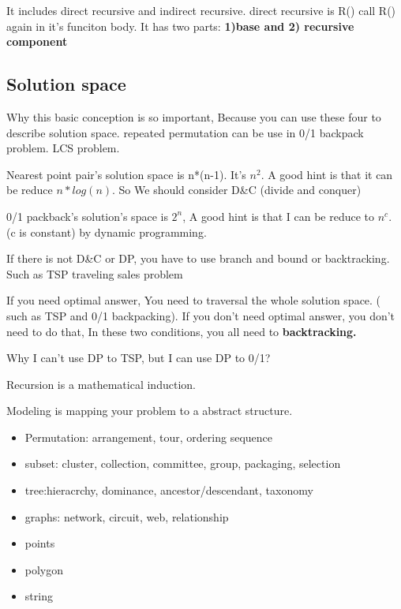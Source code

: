 \documentclass[a4paper,11pt,twoside]{book}
\begin{document}
	\par It includes direct recursive and indirect recursive. direct recursive is R() call R() again in it's funciton body. It has two parts: \textbf{1)base and 2) recursive component}


\subsection{Solution space }

\par Why this basic conception is so important, Because you can use these four to describe solution space. repeated permutation can be use in 0/1 backpack problem.  LCS problem.  

\par Nearest point pair's solution space is n*(n-1). It's $n^2$. A good hint is that it can be reduce $n*log(n)$. So We should consider D\&C (divide and conquer)

\par 0/1 packback's solution's space is $2^n$, A good hint is that I can be reduce to $n^c$. (c is constant) by dynamic programming. 

\par If there is not D\&C or DP, you have to use branch and bound or backtracking. Such as TSP traveling sales problem

\par If you need optimal answer, You need to traversal the whole solution space. ( such as TSP and 0/1 backpacking). If you don't need optimal answer, you don't need to do that, In these two conditions, you all need to \textbf{backtracking.}

\par Why I can't use DP to TSP, but I can use DP to 0/1?  

\par Recursion is a mathematical induction. 

\par Modeling is mapping your problem to a abstract structure.

\begin{itemize}
	\item Permutation: arrangement, tour, ordering sequence
	\item subset: cluster, collection, committee, group, packaging, selection
	\item tree:hieracrchy, dominance, ancestor/descendant, taxonomy
	\item graphs: network, circuit, web, relationship
	\item points
	\item polygon
	\item string 
\end{itemize}
\end{document}

